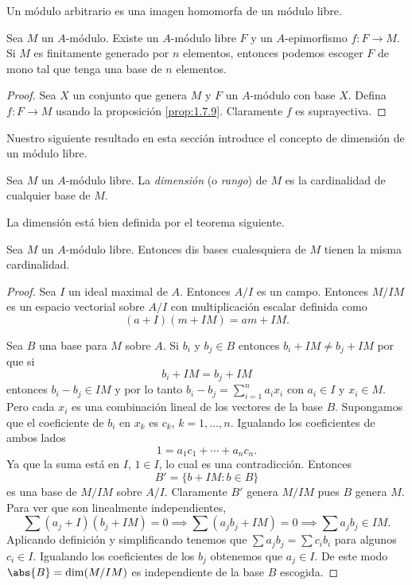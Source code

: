 Un módulo arbitrario es una imagen homomorfa de un módulo libre.

\begin{proposition}
  Sea $M$ un $A$-módulo. Existe un $A$-módulo libre $F$ y un $A$-epimorfismo $f\colon F \to M$. Si $M$ es finitamente generado por $n$ elementos, entonces podemos escoger $F$ de mono tal que tenga una base de $n$ elementos.
\end{proposition}
\begin{proof}
  Sea $X$ un conjunto que genera $M$ y $F$ un $A$-módulo con base $X$. Defina $f\colon F \to M$ usando la proposición \ref{prop:1.7.9}. Claramente $f$ es suprayectiva.
\end{proof}

Nuestro siguiente resultado en esta sección introduce el concepto de dimensión de un módulo libre.

\begin{definition}
  Sea $M$ un $A$-módulo libre. La \emph{dimensión} (o \emph{rango}) de $M$ es la cardinalidad de cualquier base de $M$.
\end{definition}

La dimensión está bien definida por el teorema siguiente.

\begin{theorem}
  Sea $M$ un $A$-módulo libre. Entonces dis bases cualesquiera de $M$ tienen la misma cardinalidad.
\end{theorem}
\begin{proof}
  Sea $I$ un ideal maximal de $A$. Entonces $A/I$ es un campo. Entonces $M/IM$ es un espacio vectorial sobre $A/I$ con multiplicación escalar definida como
  \[
    (a+I)(m+IM) = am + IM.
  \]

  Sea $B$ una base para $M$ sobre $A$. Si $b_i$ y $b_j \in B$ entonces $b_i + IM \neq b_j + IM$ por que si
  \[
    b_i + IM = b_j + IM
  \]
  entonces $b_i-b_j \in IM$ y por lo tanto $b_i - b_j = \sum_{i=1}^n a_i x_i$ con $a_i \in I$ y $x_i \in M$. Pero cada $x_i$ es una combinación lineal de los vectores de la base $B$. Supongamos que el coeficiente de $b_i$ en $x_k$ es $c_k$, $k=1,\ldots,n$. Igualando los coeficientes de ambos lados
  \[
    1 = a_1 c_1 + \cdots + a_n c_n.
  \]
  Ya que la suma está en $I$, $1 \in I$, lo cual es una contradicción. Entonces
  \[
    B' = \{b+IM : b \in B\}
  \]
  es una base de $M/IM$ sobre $A/I$. Claramente $B'$ genera $M/IM$ pues $B$ genera $M$. Para ver que son linealmente independientes,
  \[
    \sum (a_j + I) (b_j + IM) = 0 \implies \sum (a_jb_j + IM) = 0 \implies \sum a_j b_j \in IM.
  \]
  Aplicando definición y simplificando tenemos que $\sum a_j b_j = \sum c_i b_i$ para algunos $c_i \in I$. Igualando los coeficientes de los $b_j$ obtenemos que $a_j \in I$. De este modo $\abs{B} = \dim (M/IM)$ es independiente de la base $B$ escogida.
\end{proof}

